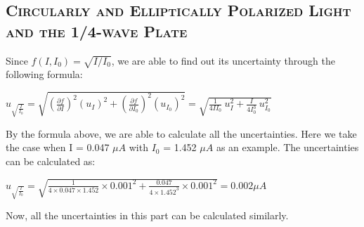 \documentclass[a4paper,12pt]{article}
\begin{document}
\begin{appendices}
	\subsection{\textsc{Circularly and Elliptically Polarized Light and the 1/4-wave Plate}}
	Since $f(I,I_0) = \sqrt{I/I_0}$, we are able to find out its uncertainty through the following formula:
	\begin{center}
	$ \displaystyle u_{\sqrt{\frac{I}{I_0}}} = \sqrt{(\frac{\partial f}{\partial I})^2(u_I)^2 + (\frac{\partial f}{\partial I_0})^2(u_{I_0})^2} = \sqrt{\frac{1}{4II_0}~u_I^2 + \frac{I}{4I_0^3}~u_{I_0}^2}$
	\end{center}
	\par By the formula above, we are able to calculate all the uncertainties. Here we take the case when I = 0.047 $\mu A$ with $I_0$ = 1.452 $\mu A$ as an example. The uncertainties can be calculated as:
	\begin{center}
	$\displaystyle u_{\sqrt{\frac{I}{I_0}}} = \sqrt{\frac{1}{4\times0.047\times1.452}\times0.001^2 + \frac{0.047}{4\times1.452^3}\times0.001^2} = 0.002 \mu A$
	\end{center}
	\par Now, all the uncertainties in this part can be calculated similarly.
	
	\newpage

\end{appendices}
\end{document}
